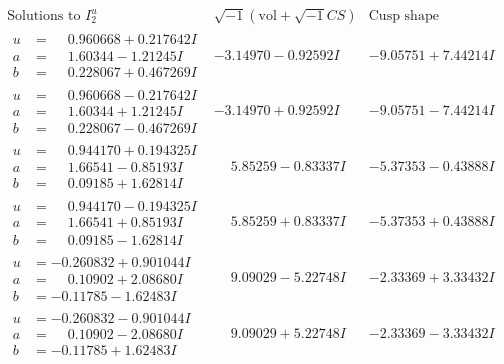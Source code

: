 \documentclass[1p]{elsarticle_modified}
\theoremstyle{definition}
\newcommand{\I}{\sqrt{-1}}
\begin{document}
$$\begin{array}{c|c|c}  
\text{Solutions to }I^u_{2}& \I (\text{vol} + \sqrt{-1}CS) & \text{Cusp shape}\\
 \hline 
\begin{aligned}
u &= \phantom{-}0.960668 + 0.217642 I \\
a &= \phantom{-}1.60344 - 1.21245 I \\
b &= \phantom{-}0.228067 + 0.467269 I\end{aligned}
 & -3.14970 - 0.92592 I & -9.05751 + 7.44214 I \\ \hline\begin{aligned}
u &= \phantom{-}0.960668 - 0.217642 I \\
a &= \phantom{-}1.60344 + 1.21245 I \\
b &= \phantom{-}0.228067 - 0.467269 I\end{aligned}
 & -3.14970 + 0.92592 I & -9.05751 - 7.44214 I \\ \hline\begin{aligned}
u &= \phantom{-}0.944170 + 0.194325 I \\
a &= \phantom{-}1.66541 - 0.85193 I \\
b &= \phantom{-}0.09185 + 1.62814 I\end{aligned}
 & \phantom{-}5.85259 - 0.83337 I & -5.37353 - 0.43888 I \\ \hline\begin{aligned}
u &= \phantom{-}0.944170 - 0.194325 I \\
a &= \phantom{-}1.66541 + 0.85193 I \\
b &= \phantom{-}0.09185 - 1.62814 I\end{aligned}
 & \phantom{-}5.85259 + 0.83337 I & -5.37353 + 0.43888 I \\ \hline\begin{aligned}
u &= -0.260832 + 0.901044 I \\
a &= \phantom{-}0.10902 + 2.08680 I \\
b &= -0.11785 - 1.62483 I\end{aligned}
 & \phantom{-}9.09029 - 5.22748 I & -2.33369 + 3.33432 I \\ \hline\begin{aligned}
u &= -0.260832 - 0.901044 I \\
a &= \phantom{-}0.10902 - 2.08680 I \\
b &= -0.11785 + 1.62483 I\end{aligned}
 & \phantom{-}9.09029 + 5.22748 I & -2.33369 - 3.33432 I \\ \hline\begin{aligned}

\end{aligned}
\end{array}$$
\end{document}
